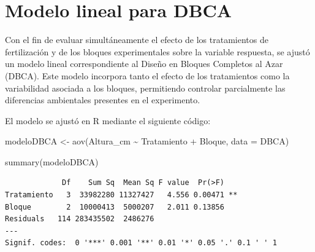 \documentclass[
  spanish,
  letterpaper,
  DIV=11,
  numbers=noendperiod]{scrreprt}
\newenvironment{Shaded}{\begin{snugshade}}{\end{snugshade}}
\newcommand{\AttributeTok}[1]{\textcolor[rgb]{0.40,0.45,0.13}{#1}}
\newcommand{\FunctionTok}[1]{\textcolor[rgb]{0.28,0.35,0.67}{#1}}
\newcommand{\NormalTok}[1]{\textcolor[rgb]{0.00,0.23,0.31}{#1}}
\newcommand{\OtherTok}[1]{\textcolor[rgb]{0.00,0.23,0.31}{#1}}
\newcommand{\SpecialCharTok}[1]{\textcolor[rgb]{0.37,0.37,0.37}{#1}}
\begin{document}
\begin{Shaded}
\end{Shaded}

\section{Modelo lineal para DBCA}\label{modelo-lineal-para-dbca}

Con el fin de evaluar simultáneamente el efecto de los tratamientos de
fertilización y de los bloques experimentales sobre la variable
respuesta, se ajustó un modelo lineal correspondiente al Diseño en
Bloques Completos al Azar (DBCA). Este modelo incorpora tanto el efecto
de los tratamientos como la variabilidad asociada a los bloques,
permitiendo controlar parcialmente las diferencias ambientales presentes
en el experimento.

El modelo se ajustó en R mediante el siguiente código:

\begin{Shaded}
\begin{Highlighting}[]
\NormalTok{modeloDBCA }\OtherTok{\textless{}{-}} \FunctionTok{aov}\NormalTok{(Altura\_cm }\SpecialCharTok{\textasciitilde{}}\NormalTok{ Tratamiento }\SpecialCharTok{+}\NormalTok{ Bloque,}
                  \AttributeTok{data =}\NormalTok{ DBCA)}

\FunctionTok{summary}\NormalTok{(modeloDBCA)}
\end{Highlighting}
\end{Shaded}

\begin{verbatim}
             Df    Sum Sq  Mean Sq F value  Pr(>F)   
Tratamiento   3  33982280 11327427   4.556 0.00471 **
Bloque        2  10000413  5000207   2.011 0.13856   
Residuals   114 283435502  2486276                   
---
Signif. codes:  0 '***' 0.001 '**' 0.01 '*' 0.05 '.' 0.1 ' ' 1
\end{verbatim}
\end{document}
